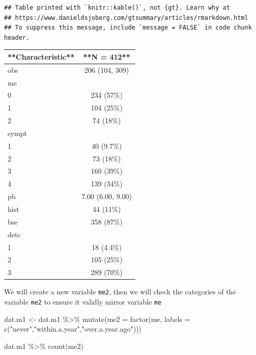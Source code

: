 \documentclass[
  10pt,
]{krantz}
\newenvironment{Shaded}{\begin{snugshade}}{\end{snugshade}}
\newcommand{\AttributeTok}[1]{\textcolor[rgb]{0.77,0.63,0.00}{#1}}
\newcommand{\FunctionTok}[1]{\textcolor[rgb]{0.00,0.00,0.00}{#1}}
\newcommand{\NormalTok}[1]{#1}
\newcommand{\OtherTok}[1]{\textcolor[rgb]{0.56,0.35,0.01}{#1}}
\newcommand{\SpecialCharTok}[1]{\textcolor[rgb]{0.00,0.00,0.00}{#1}}
\newcommand{\StringTok}[1]{\textcolor[rgb]{0.31,0.60,0.02}{#1}}
\begin{document}
\begin{verbatim}
## Table printed with `knitr::kable()`, not {gt}. Learn why at
## https://www.danieldsjoberg.com/gtsummary/articles/rmarkdown.html
## To suppress this message, include `message = FALSE` in code chunk header.
\end{verbatim}

\begin{tabular}{l|c}
\hline
**Characteristic** & **N = 412**\\
\hline
obs & 206 (104, 309)\\
\hline
me & \\
\hline
0 & 234 (57\%)\\
\hline
1 & 104 (25\%)\\
\hline
2 & 74 (18\%)\\
\hline
sympt & \\
\hline
1 & 40 (9.7\%)\\
\hline
2 & 73 (18\%)\\
\hline
3 & 160 (39\%)\\
\hline
4 & 139 (34\%)\\
\hline
pb & 7.00 (6.00, 9.00)\\
\hline
hist & 44 (11\%)\\
\hline
bse & 358 (87\%)\\
\hline
detc & \\
\hline
1 & 18 (4.4\%)\\
\hline
2 & 105 (25\%)\\
\hline
3 & 289 (70\%)\\
\hline
\end{tabular}

We will create a new variable \texttt{me2}, then we will check the categories of the variable \texttt{me2} to ensure it validly mirror variable \texttt{me}

\begin{Shaded}
\begin{Highlighting}[]
\NormalTok{dat.m1 }\OtherTok{\textless{}{-}} 
\NormalTok{  dat.m1 }\SpecialCharTok{\%\textgreater{}\%} 
  \FunctionTok{mutate}\NormalTok{(}\AttributeTok{me2 =} 
           \FunctionTok{factor}\NormalTok{(me, }
                  \AttributeTok{labels =}   \FunctionTok{c}\NormalTok{(}\StringTok{"never"}\NormalTok{,}\StringTok{"within.a.year"}\NormalTok{,}\StringTok{"over.a.year.ago"}\NormalTok{)))}
\end{Highlighting}
\end{Shaded}

\begin{Shaded}
\begin{Highlighting}[]
\NormalTok{dat.m1 }\SpecialCharTok{\%\textgreater{}\%} 
  \FunctionTok{count}\NormalTok{(me2)}
\end{Highlighting}
\end{Shaded}
\end{document}
